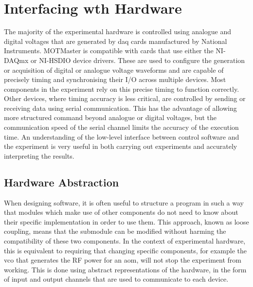 \section{Interfacing wth Hardware}
The majority of the experimental hardware is controlled using analogue and digital voltages that are generated by \ac{daq} cards manufactured by National Instruments. MOTMaster is compatible with cards that use either the NI-DAQmx or NI-HSDIO device drivers. These are used to configure the generation or acquisition of digital or analogue voltage waveforms and are capable of precisely timing and synchronising their I/O across multiple devices. Most components in the experiment rely on this precise timing to function correctly. Other devices, where timing accuracy is less critical, are controlled by sending or receiving data using serial communication. This has the advantage of allowing more structured command beyond analogue or digital voltages, but the communication speed of the serial channel limits the accuracy of the execution time. An understanding of the low-level interface between control software and the experiment is very useful in both carrying out experiments and accurately interpreting the results.
\subsection{Hardware Abstraction}\label{subsec:compinterface_hwabstraction}
When designing software, it is often useful to structure a program in such a way that modules which make use of other components do not need to know about their specific implementation in order to use them. This approach, known as loose coupling, means that the submodule can be modified without harming the compatibility of these two components. In the context of experimental hardware, this is equivalent to requiring that changing specific components, for example the \ac{vco} that generates the RF power for an \ac{aom}, will not stop the experiment from working. This is done using abstract representations of the hardware, in the form of input and output channels that are used to communicate to each device. 
